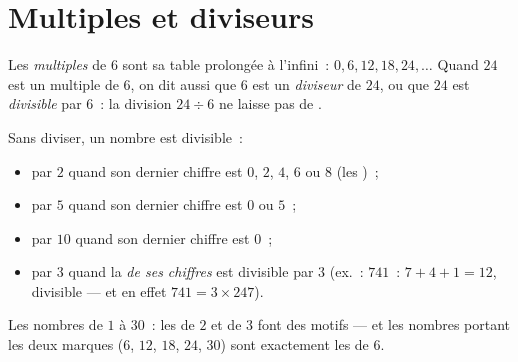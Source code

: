\section{Multiples et diviseurs}

\begin{definition}\label{def:g5:division:multiple}
Les \emph{multiples} de $6$ sont sa table
prolongée à l'infini~: $0, 6, 12, 18, 24, \dots$ Quand $24$ est un
multiple de $6$, on dit aussi que $6$ est un
\emph{diviseur} de $24$, ou que $24$ est
\emph{divisible} par $6$~: la division $24 \div 6$ ne laisse pas de
.
\end{definition}

\begin{proposition}\label{prop:g5:division:criteria}
Sans diviser, un nombre est divisible~:
\begin{itemize}
  \item par $2$ quand son dernier chiffre est $0$, $2$, $4$, $6$
        ou $8$ (les )~;
  \item par $5$ quand son dernier chiffre est $0$ ou $5$~;
  \item par $10$ quand son dernier chiffre est $0$~;
  \item par $3$ quand la \emph{ de ses chiffres} est
        divisible par $3$ (ex.~: $741$~: $7 + 4 + 1 = 12$,
        divisible --- et en effet $741 = 3 \times 247$).
\end{itemize}
\end{proposition}
\admitted

\begin{omfigure}

{\small Les nombres de $1$ à $30$~: les  de $2$ et de $3$
font des motifs --- et les nombres portant les deux marques
($6$, $12$, $18$, $24$, $30$) sont exactement les  de
$6$.}
\end{omfigure}

